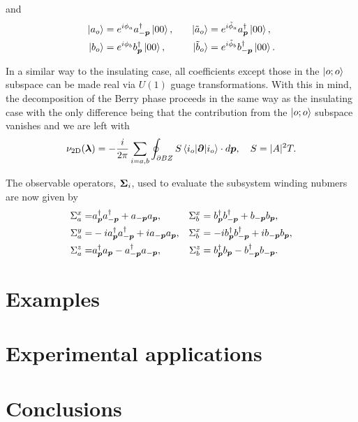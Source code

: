\noi and
\begin{align}
    \ket{a_{o}}&=e^{i\phi_{a}}a_{-\boldsymbol{p}}^{\dagger}\ket{00}, \quad &\ket{\tilde{a}_{o}}&=e^{i\tilde{\phi}_{a}}a_{\boldsymbol{p}}^{\dagger}\ket{00},\nonumber\\
    \ket{b_{o}}&=e^{i\phi_{b}}b_{\boldsymbol{p}}^{\dagger}\ket{00}, \quad &\ket{\tilde{b}_{o}}&=e^{i\tilde{\phi}_{b}}b_{-\boldsymbol{p}}^{\dagger}\ket{00}.
\end{align}

\noi In a similar way to the insulating case, all coefficients except those in the $\ket{o;o}$ subspace can be made real via $U(1)$ guage transformations. With this in mind, the decomposition of the Berry phase proceeds in the same way as the insulating case with the only difference being that the contribution from the $\ket{o;o}$ subspace vanishes and we are left with
\begin{equation}\label{eqn:SUPERSUMBERRY}
    \nu_{\text{2D}}(\boldsymbol{\lambda})=-\frac{i}{2\pi}\sum_{i=a,b}\oint_{\partial BZ} S\braket{i_{o}|\boldsymbol{\partial}|i_{o}}\cdot d\boldsymbol{p}, \quad S=|A|^{2}T.
\end{equation}

\noi The observable operators, $\boldsymbol{\Sigma}_{i}$, used to evaluate the subsystem winding nubmers are now given by
\begin{align}\label{eqn:SUPERMULTIOBS}
    \Sigma^{x}_{a}=&a_{\boldsymbol{p}}^{\dagger}a_{-\boldsymbol{p}}^{\dagger}+a_{-\boldsymbol{p}}a_{\boldsymbol{p}}, &\Sigma^{x}_{b}&=b_{\boldsymbol{p}}^{\dagger}b_{-\boldsymbol{p}}^{\dagger}+b_{-\boldsymbol{p}}b_{\boldsymbol{p}},\nonumber\\
    \Sigma^{y}_{a}=&-ia_{\boldsymbol{p}}^{\dagger}a_{-\boldsymbol{p}}^{\dagger}+ia_{-\boldsymbol{p}}a_{\boldsymbol{p}}, &\Sigma^{x}_{b}&=-ib_{\boldsymbol{p}}^{\dagger}b_{-\boldsymbol{p}}^{\dagger}+ib_{-\boldsymbol{p}}b_{\boldsymbol{p}},\nonumber\\
    \Sigma^{z}_{a}=&a_{\boldsymbol{p}}^{\dagger}a_{\boldsymbol{p}}-a^{\dagger}_{-\boldsymbol{p}}a_{-\boldsymbol{p}}, &\Sigma^{z}_{b}&=b_{\boldsymbol{p}}^{\dagger}b_{\boldsymbol{p}}-b^{\dagger}_{-\boldsymbol{p}}b_{-\boldsymbol{p}}.
\end{align}


\section{Examples}\label{sec:EXAMPLES}

\section{Experimental applications}

\section{Conclusions}








